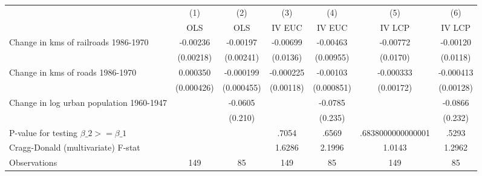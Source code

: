 {
\def\sym#1{\ifmmode^{#1}\else\(^{#1}\)\fi}
\begin{tabular}{l*{6}{c}}
\hline\hline
                &\multicolumn{1}{c}{(1)}&\multicolumn{1}{c}{(2)}&\multicolumn{1}{c}{(3)}&\multicolumn{1}{c}{(4)}&\multicolumn{1}{c}{(5)}&\multicolumn{1}{c}{(6)}\\
                &\multicolumn{1}{c}{OLS}&\multicolumn{1}{c}{OLS}&\multicolumn{1}{c}{IV EUC}&\multicolumn{1}{c}{IV EUC}&\multicolumn{1}{c}{IV LCP}&\multicolumn{1}{c}{IV LCP}\\
\hline
Change in kms of railroads 1986-1970& -0.00236         & -0.00197         & -0.00699         & -0.00463         & -0.00772         & -0.00120         \\
                &(0.00218)         &(0.00241)         & (0.0136)         &(0.00955)         & (0.0170)         & (0.0118)         \\
[1em]
Change in kms of roads 1986-1970& 0.000350         &-0.000199         &-0.000225         & -0.00103         &-0.000333         &-0.000413         \\
                &(0.000426)         &(0.000455)         &(0.00118)         &(0.000851)         &(0.00172)         &(0.00128)         \\
[1em]
Change in log urban population 1960-1947&                  &  -0.0605         &                  &  -0.0785         &                  &  -0.0866         \\
                &                  &  (0.210)         &                  &  (0.235)         &                  &  (0.232)         \\
\hline
P-value for testing $\beta\_{2} >= \beta\_{1}$&                  &                  &    .7054         &    .6569         &.6838000000000001         &    .5293         \\
Cragg-Donald (multivariate) F-stat&                  &                  &   1.6286         &   2.1996         &   1.0143         &   1.2962         \\
Observations    &      149         &       85         &      149         &       85         &      149         &       85         \\
\hline\hline
\end{tabular}
}
